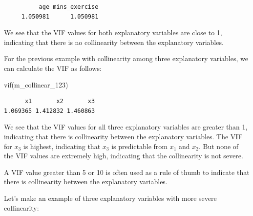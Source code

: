\documentclass[
  letterpaper,
  8pt,
  a4paper]{book}
\newenvironment{Shaded}{\begin{snugshade}}{\end{snugshade}}
\newcommand{\FunctionTok}[1]{\textcolor[rgb]{0.28,0.35,0.67}{#1}}
\newcommand{\NormalTok}[1]{\textcolor[rgb]{0.00,0.23,0.31}{#1}}
\newcounter{none} %
\begin{document}
\begin{verbatim}
          age mins_exercise 
     1.050981      1.050981 
\end{verbatim}

We see that the VIF values for both explanatory variables are close to
1, indicating that there is no collinearity between the explanatory
variables.

For the previous example with collinearity among three explanatory
variables, we can calculate the VIF as follows:

\begin{Shaded}
\begin{Highlighting}[]
\FunctionTok{vif}\NormalTok{(m\_collinear\_123)}
\end{Highlighting}
\end{Shaded}

\begin{verbatim}
      x1       x2       x3 
1.069365 1.412832 1.460863 
\end{verbatim}

We see that the VIF values for all three explanatory variables are
greater than 1, indicating that there is collinearity between the
explanatory variables. The VIF for \(x_3\) is highest, indicating that
\(x_3\) is predictable from \(x_1\) and \(x_2\). But none of the VIF
values are extremely high, indicating that the collinearity is not
severe.

A VIF value greater than 5 or 10 is often used as a rule of thumb to
indicate that there is collinearity between the explanatory variables.

Let's make an example of three explanatory variables with more severe
collinearity:
\end{document}
